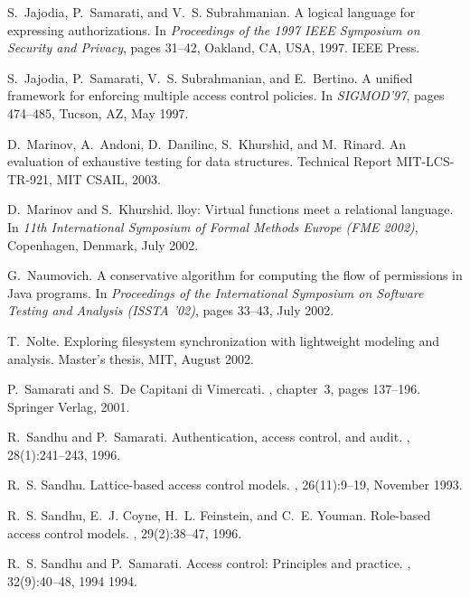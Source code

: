 \documentclass{acm_proc_article-sp}
\begin{document}
\begin{thebibliography}{10}
S.~Jajodia, P.~Samarati, and V.~S. Subrahmanian.
\newblock A logical language for expressing authorizations.
\newblock In {\em Proceedings of the 1997 IEEE Symposium on Security and
  Privacy}, pages 31--42, Oakland, CA, USA, 1997. IEEE Press.

S.~Jajodia, P.~Samarati, V.~S. Subrahmanian, and E.~Bertino.
\newblock A unified framework for enforcing multiple access control policies.
\newblock In {\em SIGMOD'97}, pages 474--485, Tucson, AZ, May 1997.

D.~Marinov, A.~Andoni, D.~Danilinc, S.~Khurshid, and M.~Rinard.
\newblock An evaluation of exhaustive testing for data structures.
\newblock Technical Report MIT-LCS-TR-921, MIT CSAIL, 2003.

D.~Marinov and S.~Khurshid.
lloy: Virtual functions meet a relational language.
\newblock In {\em 11th International Symposium of Formal Methods Europe (FME
  2002)}, Copenhagen, Denmark, July 2002.

G.~Naumovich.
\newblock A conservative algorithm for computing the flow of permissions in
  {J}ava programs.
\newblock In {\em Proceedings of the International Symposium on Software
  Testing and Analysis ({ISSTA} '02)}, pages 33--43, July 2002.

T.~Nolte.
\newblock Exploring filesystem synchronization with lightweight modeling and
  analysis.
\newblock Master's thesis, MIT, August 2002.

P.~Samarati and S.~{De Capitani di Vimercati}.
, chapter~3, pages
  137--196.
\newblock Springer Verlag, 2001.

R.~Sandhu and P.~Samarati.
\newblock Authentication, access control, and audit.
, 28(1):241--243, 1996.

R.~S. Sandhu.
\newblock Lattice-based access control models.
, 26(11):9--19, November 1993.

\balancecolumns
{}
R.~S. Sandhu, E.~J. Coyne, H.~L. Feinstein, and C.~E. Youman.
\newblock Role-based access control models.
, 29(2):38--47, 1996.

R.~S. Sandhu and P.~Samarati.
\newblock Access control: Principles and practice.
, 32(9):40--48, 1994 1994.


\end{thebibliography}
\end{document}
